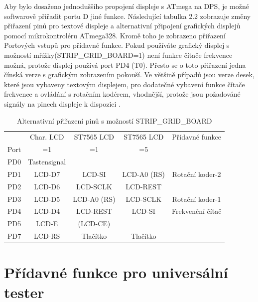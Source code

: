 Aby bylo dosaženo jednoduššího propojení displeje s ATmega na DPS, je možné softwarově přiřadit portu D jiné funkce.
Následující tabulka 2.2 zobrazuje změny přiřazení pinů pro textové displeje a alternativní
připojení grafických displejů pomocí mikrokontroléru ATmega328.
Kromě toho je zobrazeno přiřazení Portových vstupů pro přídavné funkce.
Pokud používáte grafický displej s možností mřížky(STRIP\_GRID\_BOARD=1)
není funkce čítače frekvence možná, protože displej používá port PD4 (T0).
Přesto se o toto přiřazení jedna čínská verze s grafickým zobrazením pokouší.
Ve většině případů jsou verze desek, které jsou vybaveny textovým displejem, pro dodatečné vybavení
funkce čítače frekvence a ovládání s rotačním kodérem, vhodnější, protože jsou požadováné
signály na pinech displeje k dispozici . 


\begin{table}[H]
  \begin{center}
    \begin{tabular}{| c || c | c | c | c |}
    \hline
           & Char. LCD      & ST7565 LCD     & ST7565 LCD   & Přídavné funkce \\
      Port &    =1          &    =1          &    =5        &  \\
    \hline
    \hline
    PD0    &  Tastensignal  &                &              &  \\
    \hline
    PD1    &  LCD-D7        & LCD-SI         &  LCD-A0 (RS) &  Rotační koder-2 \\
    \hline
    PD2    &  LCD-D6        & LCD-SCLK       &  LCD-REST    &  \\
    \hline
    PD3    &  LCD-D5        & LCD-A0 (RS)    &  LCD-SCLK    &  Rotační koder-1 \\
    \hline
    PD4    &  LCD-D4        & LCD-REST       &  LCD-SI      &  Frekvenční čítač \\
    \hline
    PD5    &  LCD-E         & (LCD-CE)       &              &  \\
    \hline
    PD7    & LCD-RS         & Tlačítko   & Tlačítko &  \\
    \hline
    \end{tabular}
  \end{center}
  \caption{Alternativní přiřazení pinů s možností STRIP\_GRID\_BOARD}
  \label{tab:grid-change}
\end{table}

\section{Přídavné funkce pro universální tester}
